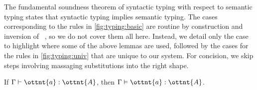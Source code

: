 \documentclass[a4paper,UKenglish,cleveref,autoref,thm-restate]{lipics-v2021}
\newcommand{\citep}[1]{\cite{#1}}
\begin{document}
The fundamental soundness theorem of syntactic typing with respect to semantic typing
states that syntactic typing implies semantic typing.
The cases corresponding to the rules in \cref{fig:typing:basic} are routine
by construction and inversion of ~\citep{lr-pearl},
so we do not cover them all here.
Instead, we detail only the  case to highlight
where some of the above lemmas are used,
followed by the cases for the rules in \cref{fig:typing:univ}
that are unique to our system.
For concision, we skip steps involving massaging substitutions into the right shape.

\begin{theorem}[Soundness] \label{thm:soundness}
  If $ \Gamma  \vdash  \ottnt{a}  \mathrel{:}  \ottnt{A} $, then $ \Gamma  \vDash  \ottnt{a}  :  \ottnt{A} $.
\end{theorem}
\end{document}
